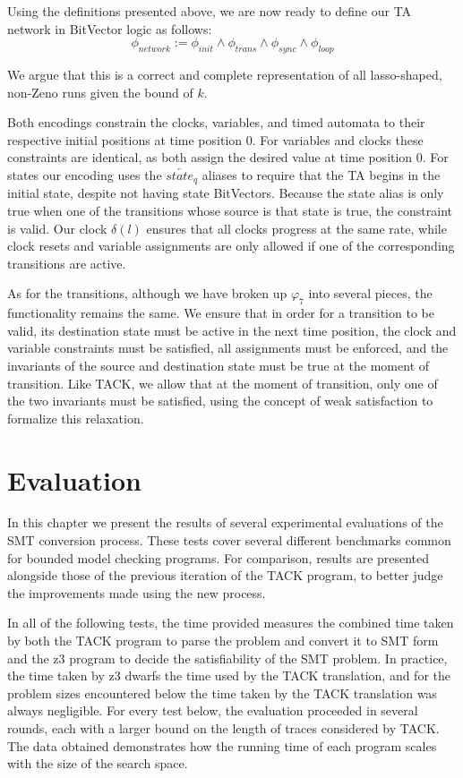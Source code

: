 \documentclass[a4paper,12pt]{article}
\begin{document}
Using the definitions presented above, we are now ready to define our TA network
in BitVector logic as follows:
\[\phi_{network} := \phi_{init} \land \phi_{trans} \land \phi_{sync} \land \phi_{loop}\]

We argue that this is a correct and complete representation of all lasso-shaped,
non-Zeno runs given the bound of \(k\).

Both encodings constrain the clocks, variables, and timed automata to their
respective initial positions at time position 0. For variables and clocks these
constraints are identical, as both assign the desired value at time position 0.
For states our encoding uses the \(\overleftarrow{state_{q}}\) aliases to
require that the TA begins in the initial state, despite not having state
BitVectors. Because the state alias is only true when one of the transitions
whose source is that state is true, the constraint is valid. Our clock
\(\delta(l)\) ensures that all clocks progress at the same rate, while clock
resets and variable assignments are only allowed if one of the corresponding
transitions are active.

As for the transitions, although we have broken up \(\varphi_{7}\) into several
pieces, the functionality remains the same. We ensure that in order for a
transition to be valid, its destination state must be active in the next time
position, the clock and variable constraints must be satisfied, all assignments
must be enforced, and the invariants of the source and destination state must be
true at the moment of transition. Like TACK, we allow that at the moment of
transition, only one of the two invariants must be satisfied, using the concept
of weak satisfaction to formalize this relaxation.

\section{Evaluation}\label{evaluation}
In this chapter we present the results of several experimental evaluations of
the SMT conversion process. These tests cover several different benchmarks
common for bounded model checking programs. For comparison, results are
presented alongside those of the previous iteration of the TACK program, to
better judge the improvements made using the new process.

In all of the following tests, the time provided measures the combined time
taken by both the TACK program to parse the problem and convert it to SMT form and
the z3 program to decide the satisfiability of the SMT problem. In practice,
the time taken by z3 dwarfs the time used by the TACK translation, and for the
problem sizes encountered below the time taken by the TACK translation was always
negligible. For every test below, the evaluation proceeded in several rounds,
each with a larger bound on the length of traces considered by TACK. The data
obtained demonstrates how the running time of each program scales with the size
of the search space.
\end{document}
